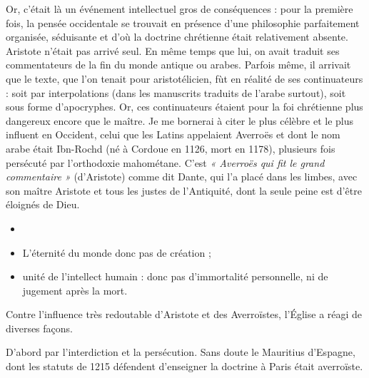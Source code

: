 \documentclass[french,twoside]{book} %
\begin{document}
Or, c’était là un événement intellectuel gros de conséquences : pour la première fois, la pensée occidentale se trouvait en présence d’une philosophie parfaitement organisée, séduisante et d’où la doctrine chrétienne était relativement absente. Aristote n’était pas arrivé seul. En même temps que lui, on avait traduit ses commentateurs de la fin du monde antique ou arabes. Parfois même, il arrivait que le texte, que l’on tenait pour aristotélicien, fùt en réalité de ses continuateurs : soit par interpolations (dans les manuscrits traduits de l’arabe surtout), soit sous forme d’apocryphes. Or, ces continuateurs étaient pour la foi chrétienne plus dangereux encore que le maître. Je me bornerai à citer le plus célèbre et le plus influent en Occident, celui que les Latins appelaient Averroës et dont le nom arabe était Ibn-Rochd (né à Cordoue en 1126, mort en 1178), plusieurs fois persécuté par l’orthodoxie mahométane. C’est \emph{« Averroës qui fit le grand commentaire »} (d’Aristote) comme dit Dante, qui l’a placé dans les limbes, avec son maître Aristote et tous les justes de l’Antiquité, dont la seule peine est d’être éloignés de Dieu.\par

\begin{itemize}[itemsep=0pt,]
\item[] \hspace{-1.5em}{\bfseries Deux thèses essentielles :}
\item L’éternité du monde donc pas de création ;
\item unité de l’intellect humain : donc pas d’immortalité personnelle, ni de jugement après la mort.
\end{itemize}
\noindent Contre l’influence très redoutable d’Aristote et des Averroïstes, l’Église a réagi de diverses façons.\par
D’abord par l’interdiction et la persécution. Sans doute le {\foreign Mauritius} d’Espagne, dont les statuts de 1215 défendent d’enseigner la doctrine à Paris était averroïste.\par
\end{document}
